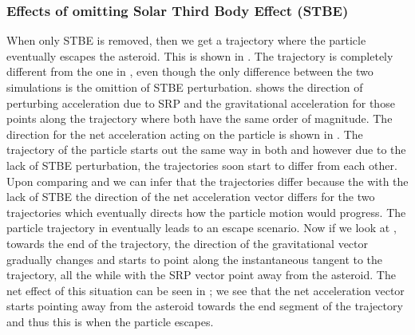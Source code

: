 \subsubsection{Effects of omitting Solar Third Body Effect (STBE)}
When only \gls{STBE} is removed, then we get a trajectory where the particle eventually escapes the asteroid. This is shown in . The trajectory is completely different from the one in , even though the only difference between the two simulations is the omittion of \gls{STBE} perturbation.  shows the direction of perturbing acceleration due to \gls{SRP} and the gravitational acceleration for those points along the trajectory where both have the same order of magnitude. The direction for the net acceleration acting on the particle is shown in . The trajectory of the particle starts out the same way in both  and  however due to the lack of \gls{STBE} perturbation, the trajectories soon start to differ from each other. Upon comparing  and  we can infer that the trajectories differ because the with the lack of \gls{STBE} the direction of the net acceleration vector differs for the two trajectories which eventually directs how the particle motion would progress. The particle trajectory in  eventually leads to an escape scenario. Now if we look at , towards the end of the trajectory, the direction of the gravitational vector gradually changes and starts to point along the instantaneous tangent to the trajectory, all the while with the \gls{SRP} vector point away from the asteroid. The net effect of this situation can be seen in ; we see that the net acceleration vector starts pointing away from the asteroid towards the end segment of the trajectory and thus this is when the particle escapes.
